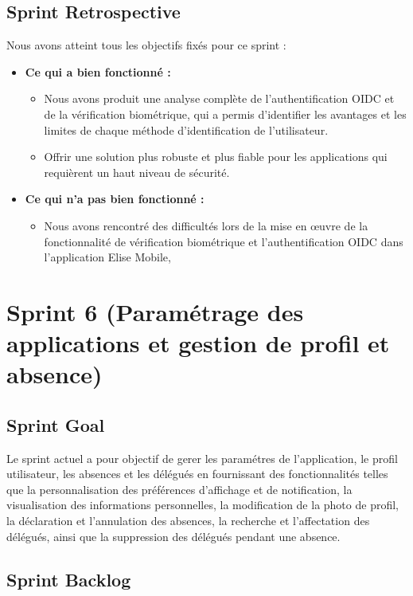 \subsection{Sprint Retrospective}
Nous avons atteint tous les objectifs fixés pour ce sprint :
\begin{itemize}
  \item \textbf{Ce qui a bien fonctionné :}
  \begin{itemize}
    \item Nous avons produit une analyse complète de l'authentification OIDC et de la vérification biométrique, qui a permis d'identifier les avantages et les limites de chaque méthode d'identification de l'utilisateur.
    \item Offrir une solution plus robuste et plus fiable pour les applications qui requièrent un haut niveau de sécurité.
    
  \end{itemize}

    \item \textbf{Ce qui n'a pas bien fonctionné :}
    \begin{itemize}
      \item Nous avons rencontré des difficultés lors de la mise en œuvre de la fonctionnalité de vérification biométrique et l'authentification OIDC dans l'application Elise Mobile,
    \end{itemize}
      
\end{itemize}
\section{Sprint 6 (Paramétrage des applications et gestion de profil et absence)}

\subsection{Sprint Goal}
Le sprint actuel a pour objectif de gerer les paramétres de l'application, le profil utilisateur, les absences et les délégués en fournissant des fonctionnalités telles que la personnalisation des préférences d'affichage et de notification, la visualisation des informations personnelles, la modification de la photo de profil, la déclaration et l'annulation des absences, la recherche et l'affectation des délégués, ainsi que la suppression des délégués pendant une absence.

\subsection{Sprint Backlog}



